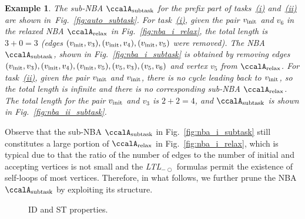 \documentclass[Afour,sageh,times]{sagej}
\newtheorem{exmp}{Example}
\newcommand{\ltl}{ {\it LTL}$_{-\bigcirc}$ }
\newcommand{\auto}[1]{\ccalA_{\textup{#1}}}
\newcommand{\vertex}[1]{v_{\textup{#1}}}
\newenvironment{cexmp}
{\addtocounter{exmp}{-1}\begin{exmp}}
  {\end{exmp}}
\begin{document}
     \begin{cexmp}
       The sub-NBA $\auto{subtask}$ for the prefix part of tasks~\hyperref[task:i]{\it (i)} and~\hyperref[task:i]{\it (ii)} are shown in~Fig.~\ref{fig:auto_subtask}. For task~\hyperref[task:i]{\it (i)}, given the pair $\vertex{init}$ and $v_6$ in the relaxed NBA $\auto{relax}$ in Fig.~\ref{fig:nba_i_relax}, the total length is $3+0=3$ (edges $(\vertex{init}, v_3), (\vertex{init}, v_4), (\vertex{init}, v_5)$ were removed). The NBA $\auto{subtask}$, shown in  Fig.~\ref{fig:nba_i_subtask} is obtained by removing edges $(\vertex{init}, v_3), (\vertex{init}, v_4), (\vertex{init}, v_5), (v_5, v_3),  (v_5, v_6)$ and vertex $v_5$ from $\auto{relax}$. For task~\hyperref[task:i]{\it (ii)}, given the pair $\vertex{init}$ and $\vertex{init}$,  there is no cycle leading back to $\vertex{init}$, so the total length is infinite and there is no corresponding sub-NBA $\auto{relax}$. The total length for the pair $\vertex{init}$ and $v_3$ is $2+2=4$, and $\auto{subtask}$ is shown in  Fig.~\ref{fig:nba_ii_subtask}.
     \end{cexmp}

Observe that the sub-NBA $\auto{subtask}$ in Fig.~\ref{fig:nba_i_subtask} still constitutes a large portion of  $\auto{relax}$ in Fig.~\ref{fig:nba_i_relax}, which is typical due to that the ratio of the number of edges to the number of initial and accepting vertices is not small and the \ltl formulas permit the existence of self-loops of most vertices. Therefore, in what follows, we further prune the NBA $\auto{subtask}$  by exploiting its structure.

\begin{figure}
  \centering
  \caption{ID and ST properties.}\label{fig:property}
\end{figure}
\end{document}
